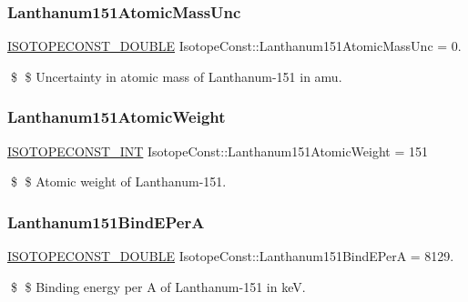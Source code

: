 \subsubsection{\texorpdfstring{Lanthanum151\+Atomic\+Mass\+Unc}{Lanthanum151AtomicMassUnc}}
{\footnotesize\ttfamily \mbox{\hyperlink{group___isotope_const-_macros_ga8f45a7272ce02c0b4c65c44636ed719a}{I\+S\+O\+T\+O\+P\+E\+C\+O\+N\+S\+T\+\_\+\+D\+O\+U\+B\+LE}} Isotope\+Const\+::\+Lanthanum151\+Atomic\+Mass\+Unc = 0.}

\$ \$ Uncertainty in atomic mass of Lanthanum-\/151 in amu. \mbox{\label{group___isotope_const-_lanthanum-_la151_ga5906e97916a3336a49549ff36b474e4f}} 
\subsubsection{\texorpdfstring{Lanthanum151\+Atomic\+Weight}{Lanthanum151AtomicWeight}}
{\footnotesize\ttfamily \mbox{\hyperlink{group___isotope_const-_macros_ga5f18360b3e99483a35c32d789e62621c}{I\+S\+O\+T\+O\+P\+E\+C\+O\+N\+S\+T\+\_\+\+I\+NT}} Isotope\+Const\+::\+Lanthanum151\+Atomic\+Weight = 151}

\$ \$ Atomic weight of Lanthanum-\/151. \mbox{\label{group___isotope_const-_lanthanum-_la151_ga87a92dab68610bf8c0881ac2890bbd3c}} 
\subsubsection{\texorpdfstring{Lanthanum151\+Bind\+E\+PerA}{Lanthanum151BindEPerA}}
{\footnotesize\ttfamily \mbox{\hyperlink{group___isotope_const-_macros_ga8f45a7272ce02c0b4c65c44636ed719a}{I\+S\+O\+T\+O\+P\+E\+C\+O\+N\+S\+T\+\_\+\+D\+O\+U\+B\+LE}} Isotope\+Const\+::\+Lanthanum151\+Bind\+E\+PerA = 8129.}

\$ \$ Binding energy per A of Lanthanum-\/151 in keV. \mbox{\label{group___isotope_const-_lanthanum-_la151_ga275d157c294f3a8d49083d3a0bff02b3}} 
